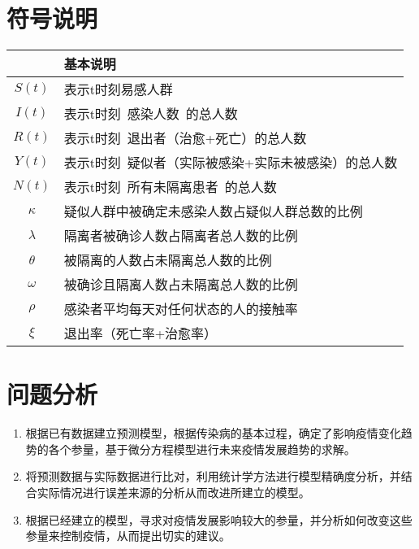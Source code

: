 \documentclass[UTF8]{ctexart}
\begin{document}
\newpage


	\section{符号说明}

	
	\begin{table}[!htbp]
	\begin{center}
	\begin{tabular}{c|l}
	\toprule[2pt]
	\rowcolor[gray]{0.8}

	\multicolumn{1}{m{8em}}{\centering 符号} & \multicolumn{1}{m{30em}}{\centering 基本说明}\\
	
	\midrule[1.3pt]
	$S(t)$ & 表示t时刻易感人群 \\
	$I(t)$ & 表示t时刻\ 感染人数\ 的总人数\\    
	$R(t)$ & 表示t时刻\ 退出者（治愈+死亡）的总人数 \\ 
	$Y(t)$ & 表示t时刻\ 疑似者（实际被感染+实际未被感染）的总人数\\    
	$N(t)$ & 表示t时刻\ 所有未隔离患者\ 的总人数\\ 
	$\kappa$ & 疑似人群中被确定未感染人数占疑似人群总数的比例\\
	$\lambda$ &隔离者被确诊人数占隔离者总人数的比例\\
	$\theta$ & 被隔离的人数占未隔离总人数的比例\\
	$\omega$ & 被确诊且隔离人数占未隔离总人数的比例\\	
	$\rho$ &  感染者平均每天对任何状态的人的接触率\\
	$\xi$ &  退出率（死亡率+治愈率）\\	
	
	\bottomrule[2pt]
	\end{tabular}  
	\end{center}
	\end{table}


\newpage


	\section{问题分析}

\vspace{4pt}
\begin{enumerate}[1)]
	\item 根据已有数据建立预测模型，根据传染病的基本过程，确定了影响疫情变化趋势的各个参量，基于微分方程模型进行未来疫情发展趋势的求解。
	
	\item  将预测数据与实际数据进行比对，利用统计学方法进行模型精确度分析，并结合实际情况进行误差来源的分析从而改进所建立的模型。

    \item  根据已经建立的模型，寻求对疫情发展影响较大的参量，并分析如何改变这些参量来控制疫情，从而提出切实的建议。


\end{enumerate}
\end{document}
